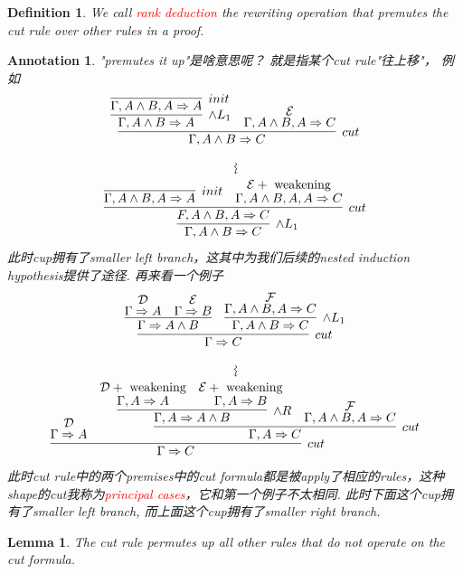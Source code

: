 \documentclass{article}
\theoremstyle{plain}
\newtheorem{lemma}[theorem]{Lemma}
\newtheorem{definition}[theorem]{Definition}
\newtheorem{annotation}[theorem]{Annotation}
\newcounter{case}
\theoremstyle{nonumberplain}
\newcommand{\redt}[1]{\textcolor{red}{#1}}
\begin{document}
\begin{definition}
\rm We call \redt{rank deduction} the rewriting operation that premutes the cut rule over other rules in a proof. 
\end{definition}

\begin{annotation}
\rm "premutes it up"是啥意思呢？ 就是指某个cut rule"往上移"， 例如
$$
\begin{gathered}
\infer[cut]{\Gamma, A \wedge B \Rightarrow C}{\infer[\wedge L_1]{\Gamma, A \wedge B \Rightarrow A}{\infer[init]{\Gamma, A \wedge B,A \Rightarrow A}{}}  & \deduce{\Gamma, A \wedge B,A \Rightarrow C}{\mathcal{E}}}\\
\mathrel{\rotatebox{270}{$\leadsto$}}\\
\infer[\wedge L_1]{\Gamma, A \wedge B \Rightarrow C}{\infer[cut]{F, A \wedge B, A \Rightarrow C}{\infer[init]{\Gamma, A \wedge B, A \Rightarrow A}{} & \deduce{\Gamma, A \wedge B, A, A \Rightarrow C}{\mathcal{E} + ~\text{weakening}}}}
\end{gathered}
$$
此时cup拥有了smaller left branch，这其中为我们后续的nested induction hypothesis提供了途径. 再来看一个例子
$$
\begin{gathered}
\infer[cut]{\Gamma \Rightarrow C}{\infer{\Gamma \Rightarrow A \wedge B}{\deduce{\Gamma \Rightarrow A}{\mathcal{D}} & \deduce{\Gamma \Rightarrow B}{\mathcal{E}}} & \infer[\wedge L_1]{\Gamma, A \wedge B \Rightarrow C}{\deduce{\Gamma, A \wedge B, A \Rightarrow C}{\mathcal{F}}}} \\
\rotatebox{270}{$\leadsto$}\\
\infer[cut]{\Gamma \Rightarrow C}{\deduce{\Gamma \Rightarrow A}{\mathcal{D}} & \infer[cut]{\Gamma, A \Rightarrow C}{ \infer[\wedge R]{\Gamma, A \Rightarrow A \wedge B}{\deduce{\Gamma, A \Rightarrow A}{\mathcal{D}+~\text{weakening}} & \deduce{\Gamma,A \Rightarrow B}{\mathcal{E}+~\text{weakening}}}& \deduce{\Gamma, A \wedge B, A \Rightarrow C}{\mathcal{F}}}}
\end{gathered}
$$
此时\emph{cut rule}中的两个premises中的cut formula都是被apply了相应的rules，这种shape的cut我称为\redt{principal cases}，它和第一个例子不太相同. 此时下面这个cup拥有了smaller left branch, 而上面这个cup拥有了smaller right branch. 
\end{annotation}

\begin{lemma}\label{permute-is-safe}
\rm The \emph{cut} rule permutes up all other rules that do not operate on the cut formula.
\end{lemma}
\end{document}

